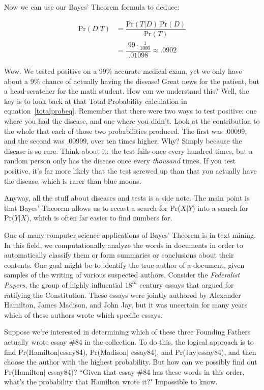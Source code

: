 Now we can use our Bayes' Theorem formula to deduce:

\begin{align*}
\text{Pr}(D|T) &= \dfrac{\text{Pr}(T|D) \ \text{Pr}(D)}{\text{Pr}(T)} \\
&= \dfrac{.99 \cdot \frac{1}{1000}}{.01098} \approx .0902
\end{align*}

Wow. We tested positive on a 99\% accurate medical exam, yet we only have
about a 9\% chance of actually having the disease! Great news for the
patient, but a head-scratcher for the math student. How can we understand
this? Well, the key is to look back at that Total Probability calculation
in equation~\ref{totalprobeq}. Remember that there were two ways to test
positive: one where you had the disease, and one where you didn't. Look at
the contribution to the whole that each of those two probabilities
produced.  The first was .00099, and the second was .00999, over ten times
higher. Why? Simply because the disease is so rare. Think about it: the
test fails once every hundred times, but a random person only has the
disease once every \textit{thousand} times. If you test positive, it's far
more likely that the test screwed up than that you actually have the
disease, which is rarer than blue moons.

Anyway, all the stuff about diseases and tests is a side note. The main
point is that Bayes' Theorem allows us to recast a search for Pr($X|Y$)
into a search for Pr($Y|X$), which is often far easier to find numbers for.

One of many computer science applications of Bayes' Theorem is in text
mining. In this field, we computationally analyze the words in documents in
order to automatically classify them or form summaries or conclusions about
their contents. One goal might be to identify the true author of a
document, given samples of the writing of various suspected authors.
Consider the \textit{Federalist Papers}, the group of highly influential
$18^{th}$ century essays that argued for ratifying the Constitution. These
essays were jointly authored by Alexander Hamilton, James Madison, and John
Jay, but it was uncertain for many years which of these authors wrote which
specific essays.

Suppose we're interested in determining which of these three Founding
Fathers actually wrote essay \#84 in the collection. To do this, the
logical approach is to find Pr(Hamilton$|$essay84), Pr(Madison$|$ essay84),
and Pr(Jay$|$essay84), and then choose the author with the highest
probability.  But how can we possibly find out Pr(Hamilton$|$ essay84)?
``Given that essay \#84 has these words in this order, what's the
probability that Hamilton wrote it?" Impossible to know.

